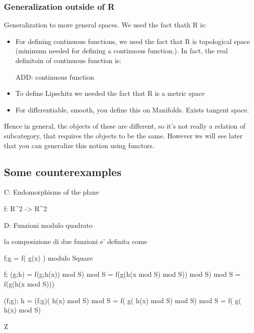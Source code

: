 






\subsubsection{Generalization outside of R}
Generalization to more general spaces. 
We used the fact thath R is:
\begin{itemize}
\item For defining continuous functions, we used the fact that R is topological space (minimum needed for defining a continuous function.). In fact, the real definitoin of continuous function is: 

ADD: continuous function

\item To define Lipschitz we needed the fact that R is a metric space 
\item For differentiable, smooth, you define this on Manifolds. Exists tangent space. 
\end{itemize}
     
Hence in general, the objects of these are different, so it's not really a relation of subcategory, that requires
the objects to be the same. However we will see later that you can generalize this notion using functors. 





\subsection{Some counterexamples}

C: Endomorphisms of the plane

f: R^2 -> R^2 



D: Funzioni modulo quadrato


la composizione di due funzioni e' definita come

  f;g =  f( g(x) ) modulo Square 
  
  
  f; (g;h) =  f(g;h(x)) mod S) mod S
           =  f(g(h(x mod S) mod S)) mod S) mod S
           =  f(g(h(x mod S)))

  (f;g); h =   (f;g)( h(x) mod S) mod S
           =    f( g( h(x) mod S) mod S) mod S
           =    f( g( h(x) mod S)
           
           
 Z 
